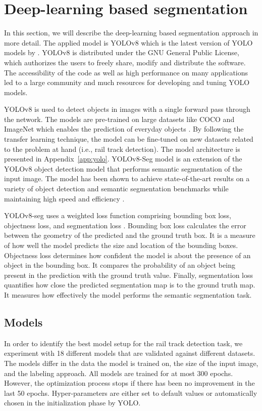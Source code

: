 \documentclass[Master,MDS,english]{BASE/twbook} %
\begin{document}
\section{Deep-learning based segmentation}

In this section, we will describe the deep-learning based segmentation approach in more detail. The applied model is YOLOv8 which is the latest version of YOLO models by \cite{Jocher_Ultralytics_YOLO_2023}.  YOLOv8 is distributed under the GNU General Public License, which authorizes the users to freely share, modify and distribute the software. The accessibility of the code as well as high performance on many applications led to a large community and much resources for developing and tuning YOLO models. 

YOLOv8 is used to detect objects in images with a single forward pass through the network. The models are pre-trained on large datasets like COCO and ImageNet which enables the prediction of everyday objects \citep{Krishnakumar}. By following the transfer learning technique, the  model can be fine-tuned on new datasets related to the problem at hand (i.e., rail track detection).
The model architecture is presented in Appendix~\ref{app:yolo}.
YOLOv8-Seg model is an extension of the YOLOv8 object detection model that performs semantic segmentation of the input image. The  model has been shown to achieve state-of-the-art results on a variety of object detection and semantic segmentation benchmarks while maintaining high speed and efficiency \citep{Krishnakumar}. 

YOLOv8-seg uses a weighted loss function comprising bounding box loss, objectness loss, and segmentation loss \citep{loss_function}. Bounding box loss calculates the error between the geometry of the predicted and the ground truth box. It is a measure of how well the model predicts the size and location of the bounding boxes. Objectness loss determines how confident the model is about the presence of an object in the bounding box. It compares the probability of an object being present in the prediction with the ground truth value.
Finally, segmentation loss quantifies how close the predicted segmentation map is to the ground truth map. It measures how effectively the model performs the semantic segmentation task.


\subsection{Models}

In order to identify the best model setup for the rail track detection task, we experiment with 18 different models that are validated against different datasets. The models differ in the data the model is trained on, the size of the input image, and the labeling approach. All models are trained for at most 300 epochs. However, the optimization process stops if there has been no improvement in the last 50 epochs. 
Hyper-parameters are either set to default values or automatically chosen in the initialization phase by YOLO.
\end{document}
